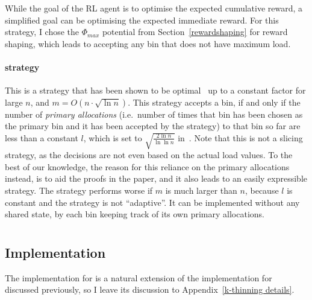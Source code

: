 While the goal of the RL agent is to optimise the expected cumulative reward, a simplified goal can be optimising the expected immediate reward. For this strategy, I chose the $\Phi_{max}$ potential from Section~\ref{rewardshaping} for reward shaping, which leads to accepting any bin that does not have maximum load.


\paragraph{\Threshold strategy \protect\footnotemark[1]} 



This is a strategy that has been shown to be optimal~\cite{feldheim2021thinning} up to a constant factor for large $n$, and $m = O(n \cdot \sqrt{\ln n})$. This strategy accepts a bin, if and only if the number of \textit{primary allocations} (i.e.\ number of times that bin has been chosen as the primary bin and it has been accepted by the strategy) to that bin so far are less than a constant $l$, which is set to $\sqrt{\frac{2\ln n}{\ln \ln n}}$ in~\cite{feldheim2021thinning}. Note that this is not a slicing strategy, as the decisions are not even based on the actual load values. To the best of our knowledge, the reason for this reliance on the primary allocations instead, is to aid the proofs in the paper, and it also leads to an easily expressible strategy. The strategy performs worse if $m$ is much larger than $n$, because $l$ is constant and the strategy is not ``adaptive''. It can be implemented without any shared state, by each bin keeping track of its own primary allocations.

\section{\KThinning}

\subsection{\DQL Implementation}

The \DQL implementation for \KThinning is a natural extension of the implementation for \TwoThinning discussed previously, so I leave its discussion to Appendix~\ref{k-thinning details}.


